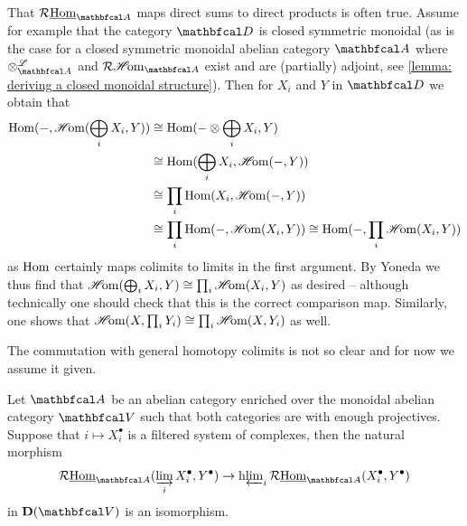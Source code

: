 \begin{remark}
	\label{remark: compatibility of enriched Homs with direct sums and products}
	
	That $\eRHom_\category{A}$ maps direct sums to direct products is often true. Assume for example that the category $\category{D}$ is closed symmetric monoidal (as is the case for a closed symmetric monoidal abelian category $\category{A}$ where $\Dotimes_\category{A}$ and $\intRHom_\category{A}$ exist and are (partially) adjoint, see \ref{lemma: deriving a closed monoidal structure}). Then for $X_i$ and $Y$ in $\category{D}$ we obtain that
	\begin{align*}
		{\operatorname{Hom}}(-,{\operatorname{\mathscr{H}\!om}}(\bigoplus_i X_i, Y)) &\cong {\operatorname{Hom}}(-\otimes \bigoplus_i X_i, Y)\\
		&\cong {\operatorname{Hom}}(\bigoplus_i X_i, {\operatorname{\mathscr{H}\!om}}(-, Y))\\
		&\cong \prod_i {\operatorname{Hom}}(X_i, {\operatorname{\mathscr{H}\!om}}(-, Y))\\
		&\cong \prod_i {\operatorname{Hom}}(-, {\operatorname{\mathscr{H}\!om}}(X_i, Y)) \cong {\operatorname{Hom}}(-, \prod_i {\operatorname{\mathscr{H}\!om}}(X_i, Y))
	\end{align*}
	as ${\operatorname{Hom}}$ certainly maps colimits to limits in the first argument. By Yoneda we thus find that ${\operatorname{\mathscr{H}\!om}}(\bigoplus_i X_i, Y) \cong \prod_i {\operatorname{\mathscr{H}\!om}}(X_i, Y)$ as desired -- although technically one should check that this is the correct comparison map. Similarly, one shows that ${\operatorname{\mathscr{H}\!om}}(X, \prod_i Y_i) \cong \prod_i {\operatorname{\mathscr{H}\!om}}(X, Y_i)$ as well.
\end{remark}

The commutation with general homotopy colimits is not so clear and for now we assume it given.
\begin{assumption}
	\label{assumption: right derived Hom maps colimits to limits}
	
	Let $\category{A}$ be an abelian category enriched over the monoidal abelian category $\category{V}$ such that both categories are  with enough projectives. Suppose that $i\mapsto X_i^\bullet$ is a filtered system of complexes, then the natural morphism
	$$\eRHom_\category{A}(\colimit_i X_i^\bullet, Y^\bullet) \to \homotopyLimit_i \eRHom_\category{A}(X_i^\bullet, Y^\bullet)$$
	in $\derived{\category{V}}$ is an isomorphism.
\end{assumption}

